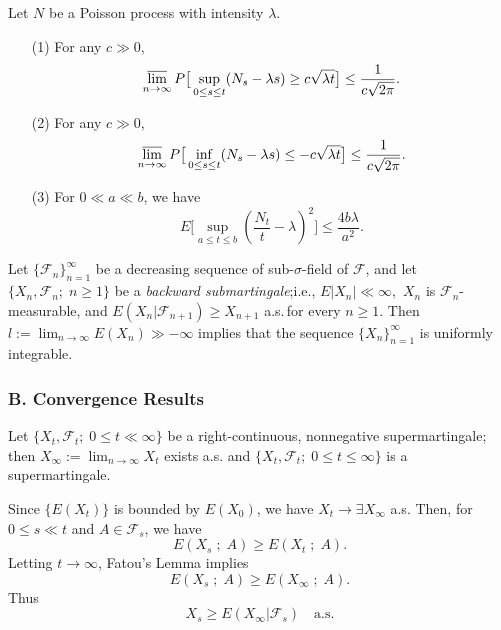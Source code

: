 \documentclass{report}
\begin{document}
\setcounter{exe}{8}
\begin{prob}
	Let \( N \) be a Poisson process with intensity \( \lambda. \)
	\begin{itemize}
		\item[(1)] For any \( c\gg 0 \),
		      \[\varlimsup_{n\to \infty }P\big[\sup_{0\le s\le t}(N_s-\lambda s)\ge c\sqrt{\lambda t}\big]\le \frac{1}{c\sqrt{2\pi}}.\]
		\item[(2)] For any \( c\gg 0 \),
		      \[\varlimsup_{n\to \infty }P\big[\inf_{0\le s\le t}(N_s-\lambda s)\le -c\sqrt{\lambda t}\big]\le \frac{1}{c\sqrt{2\pi}}.\]
		\item[(3)] For \( 0\ll a \ll b \), we have
		      \[E\big[\sup_{a\le t\le b}{(\frac{N_t}{t}-\lambda)} ^2\big]\le \frac{4b\lambda}{a^2}.\]
	\end{itemize}
\end{prob}

\setcounter{exe}{10}
\begin{prob}
	Let \( \{\mathscr{F}_n \} _{n=1}^{\infty } \) be a decreasing sequence of sub-\( \sigma \)-field
	of  \( \mathscr{F} \), and let \( \{X_n,\mathscr{F}_n;\; n\ge1\} \) be a \textit{backward submartingale};\;i.e., \( E|X_n|\ll \infty, \) \( X_n \) is \( \mathscr{F}_n \)-measurable, and
	\( E(X_n|\mathscr{F}_{n+1})\ge X_{n+1} \) a.s.\,for every \( n\ge 1 \). 
	Then \( l:=\lim_{n\to \infty }E(X_n)\gg -\infty \) implies that the sequence \( \{ X_n \} _{n=1}^{\infty } \) is uniformly integrable.
\end{prob}

\subsubsection*{B. Convergence Results}
\begin{prob}
	Let \( \{X_t, \mathscr{F}_t;\; 0\le t\ll \infty \} \) be a right-continuous, nonnegative
	supermartingale; then \( X_{\infty }:=\lim_{n\to \infty }X_t \) exists a.s.
	and \( \{X_t, \mathscr{F}_t;\; 0\le t\le \infty \} \) is a supermartingale.
\end{prob}
\begin{prf}
	Since \( \{E(X_t)\} \) is bounded by \( E(X_0) \), we have \( X_t\to \exists X_{\infty } \) a.s.
	Then, for \( 0\le s \ll t \) and \( A\in \mathscr{F}_s \), we have
	\[E(X_s \;;\;A)\ge E(X_t \;;\;A).\]
	Letting \( t\to \infty \), Fatou's Lemma implies
	\[E(X_s \;;\;A)\ge E(X_{\infty } \;;\;A).\]
	Thus 
	\[X_s\ge E(X_{\infty }|\mathscr{F}_s)\quad \mathrm{a.s.}\]
\end{prf}
\end{document}

